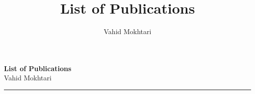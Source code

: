 \documentclass[10pt]{article}
\title{\textbf{List of Publications}}
\author{Vahid Mokhtari}
\date{}
\makeatletter
\newcommand{\soptitle}{List of Publications}
\newcommand{\yourname}{Vahid Mokhtari}
\newcommand{\youremail}{mokhtari.vahid@kuleuven.be}
\newcommand{\yourweb}{https://www.kuleuven.be/wieiswie/en/person/00126544}
\makeatother
\begin{document}
\begin{center}
{\bf\LARGE\soptitle}\\\vspace{5pt}
\large \yourname\\
\end{center}

\medskip\hrule\bigskip


\begin{refsection} %
\renewcommand{\refname}{Journal Papers}

\nocite{yudha:2021:composed} %
\nocite{vahid2017prletter} %
\nocite{vahid2016jint} %
\nocite{race2014} %

\printbibliography[heading=subbibliography] %
\end{refsection}


\begin{refsection} %
\renewcommand{\refname}{Conference Papers}

\nocite{vahid:2021:icar} %
\nocite{vahid2017iros} %
\nocite{vahid2017icarsc} %
\nocite{vahid2016icaps} %
\nocite{vahid2014experience} %
\nocite{vahid2015icarsc} %
\nocite{vahid2015recpad} %
\nocite{lim2013roman} %
\nocite{ensemble2013} %
\nocite{Fathzadeh2008} %
\nocite{Fathzadeh2006mining} %
\nocite{Fathzadeh2006} %
\nocite{Fathzadeh2005coaching} %

\printbibliography[heading=subbibliography] %
\end{refsection}
\end{document}
